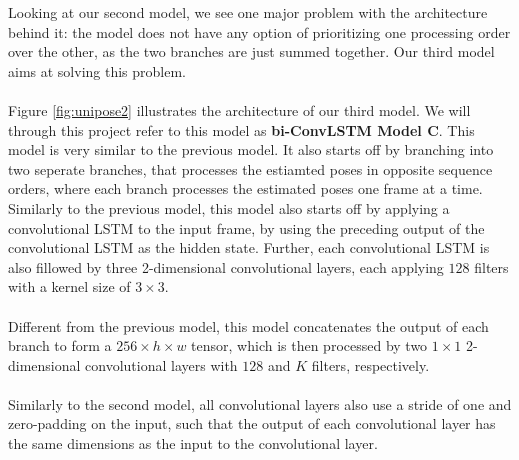 \documentclass[./main.tex]{subfiles}
\begin{document}
\noindent Looking at our second model, we see one major problem with the architecture behind it: the model does not have any option of prioritizing one processing order over the other, as the two branches are just summed together. Our third model aims at solving this problem.
\\
\\
Figure \ref{fig:unipose2} illustrates the architecture of our third model. We will through this project refer to this model as \textbf{bi-ConvLSTM Model C}. This model is very similar to the previous model. It also starts off by branching into two seperate branches, that processes the estiamted poses in opposite sequence orders, where each branch processes the estimated poses one frame at a time. Similarly to the previous model, this model also starts off by applying a convolutional LSTM to the input frame, by using the preceding output of the convolutional LSTM as the hidden state. Further, each convolutional LSTM is also fillowed by three 2-dimensional convolutional layers, each applying $128$ filters with a kernel size of $3 \times 3$. 
\\
\\
Different from the previous model, this model concatenates the output of each branch to form a $256 \times h \times w$ tensor, which is then processed by two $1 \times 1$ 2-dimensional convolutional layers with $128$ and $K$ filters, respectively.
\\
\\
Similarly to the second model, all convolutional layers also use a stride of one and zero-padding on the input, such that the output of each convolutional layer has the same dimensions as the input to the convolutional layer.
\end{document}
